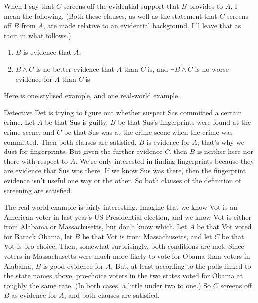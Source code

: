 When I say that \(C\) screens off the evidential support that \(B\) provides to \(A\), I mean the following. (Both these clauses, as well as the statement that \(C\) screens off \(B\) from \(A\), are made relative to an evidential background. I'll leave that as tacit in what follows.)

\begin{enumerate}
\item \(B\) is evidence that \(A\).
\item  \(B \wedge C\) is no better evidence that \(A\) than \(C\) is, and \(\neg B \wedge C\) is no worse evidence for \(A\) than \(C\) is.
\end{enumerate}

\noindent Here is one stylised example, and one real-world example.

Detective Det is trying to figure out whether suspect Sus committed a certain crime. Let \(A\) be that Sus is guilty, \(B\) be that Sus's fingerprints were found at the crime scene, and \(C\) be that Sus was at the crime scene when the crime was committed. Then both clauses are satisfied. \(B\) is evidence for \(A\); that's why we dust for fingerprints. But given the further evidence \(C\), then \(B\) is neither here nor there with respect to \(A\). We're only interested in finding fingerprints because they are evidence that Sus was there. If we know Sus was there, then the fingerprint evidence isn't useful one way or the other. So both clauses of the definition of screening are satisfied.

The real world example is fairly interesting. Imagine that we know Vot is an American voter in last year's US Presidential election, and we know Vot is either from \href{http://www.surveyusa.com/client/PollReport.aspx?g=29477487-154c-440d-bd34-123e584eedfb}{Alabama} or \href{http://www.surveyusa.com/client/PollReport.aspx?g=3d3e8e07-a4a1-4168-8f1e-4b8ecb26215a}{Massachusetts}, but don't know which. Let \(A\) be that Vot voted for Barack Obama, let \(B\) be that Vot is from Massachusetts, and let \(C\) be that Vot is pro-choice. Then, somewhat surprisingly, both conditions are met. Since voters in Massachusetts were much more likely to vote for Obama than voters in Alabama, \(B\) is good evidence for \(A\). But, at least according to the polls linked to the state names above, pro-choice voters in the two states voted for Obama at roughly the same rate. (In both cases, a little under two to one.) So \(C\) screens off \(B\) as evidence for \(A\), and both clauses are satisfied.

